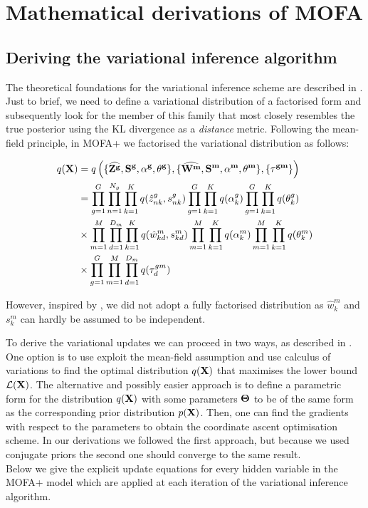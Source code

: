\chapter{Mathematical derivations of MOFA} \label{appendix:mofa}

\section{Deriving the variational inference algorithm}

The theoretical foundations for the variational inference scheme are described in . Just to brief, we need to define a variational distribution of a factorised form and subsequently look for the member of this family that most closely resembles the true posterior using the KL divergence as a \textit{distance} metric. Following the mean-field principle, in MOFA+ we factorised the variational distribution as follows:

\begin{equation} \begin{aligned}
	q({\bf X}) &= q \left(\{\widehat{{\bf Z}^{\bf g}}, {\bf S}^{\bf g}, \bf{\alpha^g}, \bf{\theta^g}\}, \{\widehat{{\bf W}^m}, {\bf S}^m, \bf\alpha^m, \bf\theta^m\}, \{ \bf\tau^{gm}\} \right)\\
	&= \prod_{g=1}^{G} \prod_{n=1}^{N_g} \prod_{k=1}^{K} q(\hat{z}_{nk}^g, s_{nk}^g) \prod_{g=1}^{G} \prod_{k=1}^{K} q(\alpha_k^g) \prod_{g=1}^{G} \prod_{k=1}^{K} q(\theta_k^g) \\
	&\times \prod_{m=1}^{M} \prod_{d=1}^{D_m} \prod_{k=1}^{K} q(\hat{w}_{kd}^m,s_{kd}^m) \prod_{m=1}^{M} \prod_{k=1}^{K} q(\alpha_k^m) \prod_{m=1}^{M} \prod_{k=1}^{K} q(\theta_k^m)  \\
	&\times \prod_{g=1}^{G} \prod_{m=1}^{M} \prod_{d=1}^{D_m} q(\tau_d^{gm})
\end{aligned} \end{equation}

However, inspired by \cite{Titsias2011}, we did not adopt a fully factorised distribution as $\hat{w}_k^m$ and $s_k^m$ can hardly be assumed to be independent.

To derive the variational updates we can proceed in two ways, as described in . One option is to use exploit the  mean-field assumption and use calculus of variations to find the optimal distribution $q({\bf X})$ that maximises the lower bound $\mathcal{L}({\bf X})$\cite{Bishop,Murphy}. The alternative and possibly easier approach is to define a parametric form for the distribution $q({\bf X})$ with some parameters $\mbox{\boldmath $\Theta$}$ to be of the same form as the corresponding prior distribution $p({\bf X})$. Then, one can find the gradients with respect to the parameters to obtain the coordinate ascent optimisation scheme. In our derivations we followed the first approach, but because we used conjugate priors the second one should converge to the same result.\\
Below we give the explicit update equations for every hidden variable in the MOFA+ model which are applied at each iteration of the variational inference algorithm.

